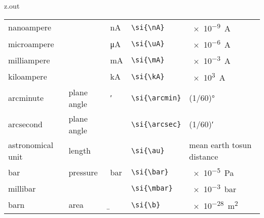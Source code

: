 \begin{VerbatimOut}{z.out}
{\begin{longtable}{@{}P{1.4in}P{1in}llP{1.8in}@{}}
    \quad nanoampere&
      \ditto&
      \si{\nA}&
      \verb+\si{\nA}+&
      \SI{e-9}{\A}\\
    \quad microampere&
      \ditto&
      \si{\uA}&
      \verb+\si{\uA}+&
      \SI{e-6}{\A}\\
    \quad milliampere&
      \ditto&
      \si{\mA}&
      \verb+\si{\mA}+&
      \SI{e-3}{\A}\\
    \quad kiloampere&
      \ditto&
      \si{\kA}&
      \verb+\si{\kA}+&
      \SI{e3}{\A}\\
    \vsp
    \vsp
    arcminute&
      plane angle&
      \si{\arcmin}&
      \verb+\si{\arcmin}+&
      (1/60)\unit{\degree\nounit}\\
    arcsecond&
      plane angle&
      \si{\arcsec}&
      \verb+\si{\arcsec}+&
      (1/60)\unit{\arcmin\nounit}\\
    \vsp
    astronomical unit&
      length&
      \si{\au}&
      \verb+\si{\au}+&
      mean earth to\newline sun distance\\
    \vsp
    bar&
      pressure&
      \si{\bar}&
      \verb+\si{\bar}+&
      \SI{e-5}{\Pa}\\
    \quad millibar&
      \ditto&
      \si{\mbar}&
      \verb+\si{\mbar}+&
      \SI{e-3}{\bar}\\
    \vsp
    barn&
      area&
      \si{\b}&
      \verb+\si{\b}+&
      \SI{e-28}{\m\squared}\\

\end{longtable}}
\end{VerbatimOut}
